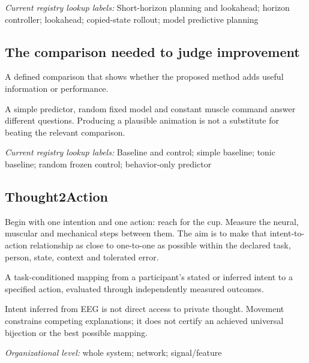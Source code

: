 \noindent\textit{Current registry lookup labels:} Short-horizon planning and lookahead; horizon controller; lookahead; copied-state rollout; model predictive planning\par

\begin{samepage}
\subsection*{The comparison needed to judge improvement}
\noindent A defined comparison that shows whether the proposed method adds useful information or performance.\par
\end{samepage}
\begin{samepage}
\noindent A simple predictor, random fixed model and constant muscle command answer different questions. Producing a plausible animation is not a substitute for beating the relevant comparison.\par\nopagebreak[4]

\end{samepage}


\noindent\textit{Current registry lookup labels:} Baseline and control; simple baseline; tonic baseline; random frozen control; behavior-only predictor\par

\begin{samepage}
\subsection*{Thought2Action}
\noindent Begin with one intention and one action: reach for the cup. Measure the neural, muscular and mechanical steps between them. The aim is to make that intent-to-action relationship as close to one-to-one as possible within the declared task, person, state, context and tolerated error.\par
\end{samepage}
\noindent A task-conditioned mapping from a participant's stated or inferred intent to a specified action, evaluated through independently measured outcomes.\par
\noindent Intent inferred from EEG is not direct access to private thought. Movement constrains competing explanations; it does not certify an achieved universal bijection or the best possible mapping.\par
\begin{samepage}
\noindent\textit{Organizational level:} whole system; network; signal/feature\par\nopagebreak[4]

\end{samepage}


